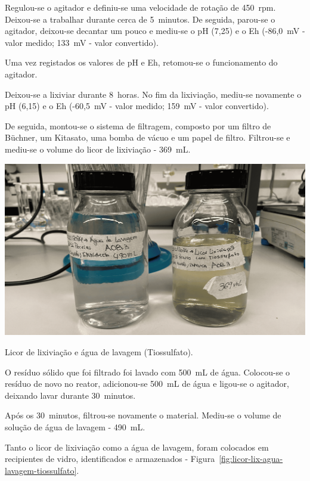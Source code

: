 Regulou-se o agitador e definiu-se uma velocidade de rotação de 450~rpm.
Deixou-se a trabalhar durante cerca de 5~minutos.
De seguida, parou-se o agitador, deixou-se decantar um pouco e mediu-se o pH (7,25) e o Eh (-86,0~mV - valor medido; 133~mV - valor convertido).

Uma vez registados os valores de pH e Eh, retomou-se o funcionamento do agitador.


Deixou-se a lixiviar durante 8~horas.
No fim da lixiviação, mediu-se novamente o pH (6,15) e o Eh (-60,5~mV - valor medido; 159~mV - valor convertido).

De seguida, montou-se o sistema de filtragem, composto por um filtro de Büchner, um Kitasato, uma bomba de vácuo e um papel de filtro.
Filtrou-se e mediu-se o volume do licor de lixiviação - 369~mL\@.

\begin{marginfigure}
    \centering
    \includegraphics[width=0.9\linewidth]{figures/licor e agua lavagem lix tiossulfato}
    \caption{Licor de lixiviação e água de lavagem (Tiossulfato).}
    \label{fig:licor-lix-agua-lavagem-tiossulfato}
\end{marginfigure}

O resíduo sólido que foi filtrado foi lavado com 500~mL de água.
Colocou-se o resíduo de novo no reator, adicionou-se 500~mL de água e ligou-se o agitador, deixando lavar durante 30~minutos.

Após os 30~minutos, filtrou-se novamente o material.
Mediu-se o volume de solução de água de lavagem - 490~mL\@.

Tanto o licor de lixiviação como a água de lavagem, foram colocados em recipientes de vidro, identificados e armazenados - Figura~\ref{fig:licor-lix-agua-lavagem-tiossulfato}.

